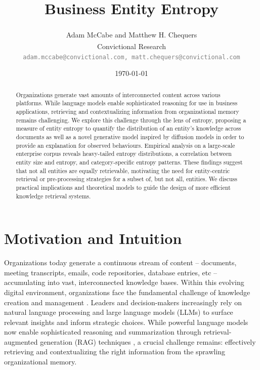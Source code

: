 \documentclass[11pt,a4paper]{article}
\title{Business Entity Entropy}
\author{Adam McCabe\textsuperscript{\dag} and Matthew H. Chequers\textsuperscript{\dag}\\[6pt]
\textsuperscript{\dag}Convictional Research\\
\textcolor{grey}{\texttt{adam.mccabe@convictional.com, matt.chequers@convictional.com}}}
\date{\today}
\begin{document}
\maketitle

\begin{abstract}
\noindent Organizations generate vast amounts of interconnected content across various platforms. While language models enable sophisticated reasoning for use in business applications, retrieving and contextualizing information from organizational memory remains challenging. We explore this challenge through the lens of entropy, proposing a measure of entity entropy to quantify the distribution of an entity's knowledge across documents as well as a novel generative model inspired by diffusion models in order to provide an explanation for observed behaviours. Empirical analysis on a large-scale enterprise corpus reveals heavy-tailed entropy distributions, a correlation between entity size and entropy, and category-specific entropy patterns. These findings suggest that not all entities are equally retrievable, motivating the need for entity-centric retrieval or pre-processing strategies for a subset of, but not all, entities. We discuss practical implications and theoretical models to guide the design of more efficient knowledge retrieval systems.
\end{abstract}

\section{Motivation and Intuition}
Organizations today generate a continuous stream of content -- documents, meeting transcripts, emails, code repositories, database entries, etc -- accumulating into vast, interconnected knowledge bases. Within this evolving digital environment, organizations face the fundamental challenge of knowledge creation and management \cite{nonaka1994dynamic}. Leaders and decision-makers increasingly rely on natural language processing and large language models (LLMs) to surface relevant insights and inform strategic choices. While powerful language models now enable sophisticated reasoning and summarization through retrieval-augmented generation (RAG) techniques \cite{lewis2020retrieval}, a crucial challenge remains: effectively retrieving and contextualizing the right information from the sprawling organizational memory.
\end{document}

